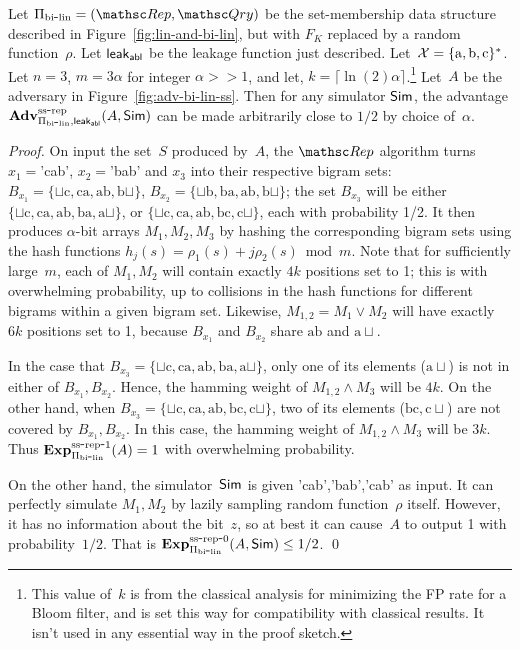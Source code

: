 \begin{theorem}\label{thm:bi-lin-ss}
Let $\setprim_{\bilin}= (\Rep, \Qry)$ be the set-membership data
structure described in Figure~\ref{fig:lin-and-bi-lin}, but with
$F_{K}$ replaced by a random function~$\rho$. Let
${\sf leak}_{\mathsf{abl}}$ be the leakage function just described.
Let~${\cal X}=\{\mathrm{a,b,c}\}^*$. Let $n=3$,  $m=3\alpha $ for
integer $\alpha >> 1$, and let, $k = \lceil \ln(2) \alpha
\rceil$.\footnote{This value of~$k$ is from the classical analysis for
minimizing the FP rate for a Bloom filter, and is set this way for
compatibility with classical results.  It isn't used in any
essential way in the proof sketch.}  Let~$A$ be the adversary in
Figure~\ref{fig:adv-bi-lin-ss}.  Then for any simulator ${\sf Sim}$, the
advantage
$\mathrm{\mathbf{Adv}}^{\mathrm{ss\mbox{-}rep}}_{\Pi_{\mathrm{bi}\mbox{-}\mathrm{lin}},{\sf leak}_{\mathsf{abl}}}(A,{\sf Sim})$ can be
made arbitrarily close to $1/2$ by choice of~$\alpha$.
\end{theorem}
\begin{proof}%
On input the set~$S$ produced by~$A$, the $\Rep$ algorithm turns $x_1=$'cab', $x_2=$'bab' and $x_3$ into their respective bigram sets: $B_{x_1}=\{\sqcup\mathrm{c},\mathrm{ca},\mathrm{ab},\mathrm{b}\sqcup\}$, $B_{x_2}=\{\sqcup\mathrm{b},\mathrm{ba},\mathrm{ab}, \mathrm{b}\sqcup \}$; the set $B_{x_3}$ will be either $\{\sqcup\mathrm{c},\mathrm{ca},\mathrm{ab},\mathrm{ba}, \mathrm{a}\sqcup\}$, or $\{\sqcup\mathrm{c},\mathrm{ca},\mathrm{ab},\mathrm{bc}, \mathrm{c}\sqcup\}$, each with probability 1/2.  It then produces $\alpha$-bit arrays $M_1, M_2, M_3$ by hashing the corresponding bigram sets using the hash functions $h_j(s)=\rho_1(s)+ j\rho_2(s) \bmod m$.  Note that for sufficiently large~$m$, each of $M_1,M_2$ will contain exactly $4k$ positions set to 1; this is with overwhelming probability, up to collisions in the hash functions for different bigrams within a given bigram set.  Likewise, $M_{1,2}=M_1 \vee M_2$ will have exactly $6k$ positions set to 1, because $B_{x_1}$ and $B_{x_2}$ share $\mathrm{ab}$ and $\mathrm{a}\sqcup$.

In the case that $B_{x_3}=\{\sqcup\mathrm{c},\mathrm{ca},\mathrm{ab},\mathrm{ba}, \mathrm{a}\sqcup\}$, only one of its elements ($\mathrm{a}\sqcup$) is not in either of $B_{x_1},B_{x_2}$.  Hence, the hamming weight of $M_{1,2}\wedge M_3$ will be $4k$.  On the other hand, when $B_{x_3} = \{\sqcup\mathrm{c},\mathrm{ca},\mathrm{ab},\mathrm{bc}, \mathrm{c}\sqcup\}$, two of its elements ($\mathrm{bc}, \mathrm{c}\sqcup$) are not covered by $B_{x_1},B_{x_2}$.  In this case, the hamming weight of $M_{1,2} \wedge M_3$ will be $3k$.  Thus $\mathrm{\mathbf{Exp}}^{\mathrm{ss\mbox{-}rep\mbox{-}1}}_{\Pi_{\mathrm{bi}\mbox{-}\mathrm{lin}}}(A)=1$ with overwhelming probability.

On the other hand, the simulator~${\sf Sim}$ is given 'cab','bab','cab' as
input.  It can perfectly simulate $M_1,M_2$ by lazily sampling random
function~$\rho$ itself.  However, it has no information about the
bit~$z$, so at best it can cause~$A$ to output 1 with
probability~$1/2$.  That is $\mathrm{\mathbf{Exp}}^{\mathrm{ss\mbox{-}rep\mbox{-}0}}_{\Pi_{\mathrm{bi}\mbox{-}\mathrm{lin}}}(A,{\sf Sim}) \leq 1/2$. \hfill\qed
\end{proof}




